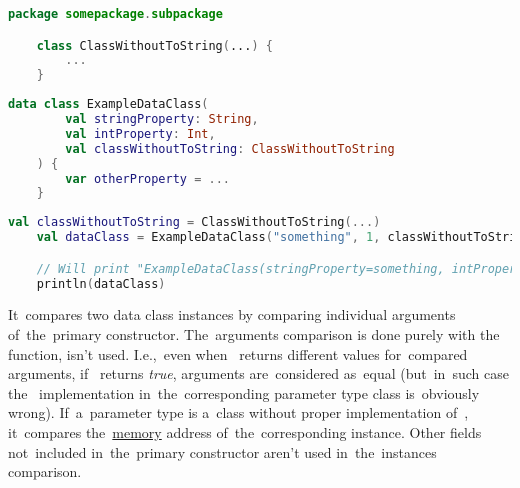 \example
\begin{lstlisting}[language=Kotlin, title={Class without proper "toString" implementation}]
    package somepackage.subpackage

    class ClassWithoutToString(...) {
        ...
    }
\end{lstlisting}
\begin{lstlisting}[language=Kotlin, title={Data class}]
    data class ExampleDataClass(
        val stringProperty: String,
        val intProperty: Int,
        val classWithoutToString: ClassWithoutToString
    ) {
        var otherProperty = ...
    }
\end{lstlisting}
\newpage
\begin{lstlisting}[language=Kotlin, title={\itq{toString} behavior}]
    val classWithoutToString = ClassWithoutToString(...)
    val dataClass = ExampleDataClass("something", 1, classWithoutToString)

    // Will print "ExampleDataClass(stringProperty=something, intProperty=1, classWithoutToString= somepackage.subpackage.ClassWithoutToString@SOME_MESS)"
    println(dataClass)
\end{lstlisting}
\newline

\label{kotlindataclassequals}
It~compares two data class instances by comparing individual arguments of~the~primary constructor.
The~arguments comparison is done purely with the~ function,  isn't used.
I.e.,~even when~ returns different values for~compared arguments, if~ returns \textit{true}, arguments are~considered as~equal (but~in~such case the~ implementation in~the~corresponding parameter type class is~obviously wrong).
If~a~parameter type is a~class without proper implementation of~, it~compares \mbox{the \hyperref[systemmemory]{memory}} address of~the~corresponding instance.
Other fields not~included in~the~primary constructor aren't used in~the~instances comparison.
\newline


